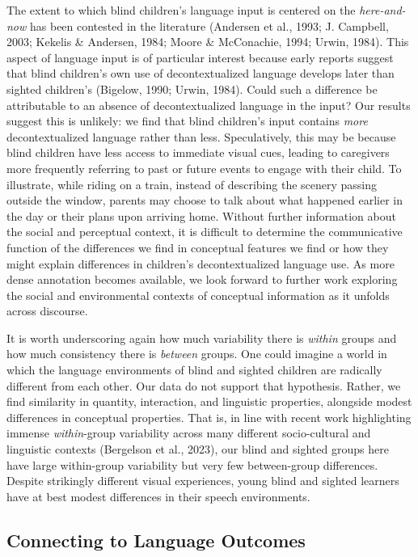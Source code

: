 \documentclass[
  man,floatsintext]{apa6}
\begin{document}
The extent to which blind children's language input is centered on the \emph{here-and-now} has been contested in the literature (Andersen et al., 1993; J. Campbell, 2003; Kekelis \& Andersen, 1984; Moore \& McConachie, 1994; Urwin, 1984). This aspect of language input is of particular interest because early reports suggest that blind children's own use of decontextualized language develops later than sighted children's (Bigelow, 1990; Urwin, 1984). Could such a difference be attributable to an absence of decontextualized language in the input? Our results suggest this is unlikely: we find that blind children's input contains \emph{more} decontextualized language rather than less. Speculatively, this may be because blind children have less access to immediate visual cues, leading to caregivers more frequently referring to past or future events to engage with their child. To illustrate, while riding on a train, instead of describing the scenery passing outside the window, parents may choose to talk about what happened earlier in the day or their plans upon arriving home. Without further information about the social and perceptual context, it is difficult to determine the communicative function of the differences we find in conceptual features we find or how they might explain differences in children's decontextualized language use. As more dense annotation becomes available, we look forward to further work exploring the social and environmental contexts of conceptual information as it unfolds across discourse.

It is worth underscoring again how much variability there is \emph{within} groups and how much consistency there is \emph{between} groups. One could imagine a world in which the language environments of blind and sighted children are radically different from each other. Our data do not support that hypothesis. Rather, we find similarity in quantity, interaction, and linguistic properties, alongside modest differences in conceptual properties. That is, in line with recent work highlighting immense \emph{within}-group variability across many different socio-cultural and linguistic contexts (Bergelson et al., 2023), our blind and sighted groups here have large within-group variability but very few between-group differences. Despite strikingly different visual experiences, young blind and sighted learners have at best modest differences in their speech environments.

\hypertarget{connecting-to-language-outcomes}{%
\subsection{Connecting to Language Outcomes}\label{connecting-to-language-outcomes}}
\end{document}
